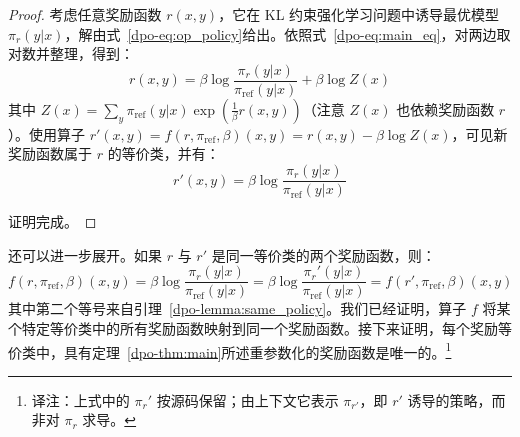\begin{proof}
考虑任意奖励函数 $r(x,y)$，它在 KL 约束强化学习问题中诱导最优模型 $\pi_r(y|x)$，解由式~\ref{dpo-eq:op_policy}给出。依照式~\ref{dpo-eq:main_eq}，对两边取对数并整理，得到：
\label{dpo-display-29}
\begin{equation*}
    r(x,y) =\beta \log \frac{\pi_r(y|x)}{\pi_{\mathrm{ref}}(y|x)} + \beta \log Z(x)
\end{equation*}
其中 $Z(x)=\sum_y\pi_{\mathrm{ref}}(y|x)\exp(\frac1\beta r(x,y))$（注意 $Z(x)$ 也依赖奖励函数 $r$）。使用算子 $r'(x,y)=f(r,\pi_{\mathrm{ref}},\beta)(x,y)=r(x,y)-\beta\log Z(x)$，可见新奖励函数属于 $r$ 的等价类，并有：
\label{dpo-display-30}
\begin{equation*}
    r'(x,y) =\beta \log \frac{\pi_r(y|x)}{\pi_{\mathrm{ref}}(y|x)}
\end{equation*}

证明完成。\qedhere
\end{proof}


还可以进一步展开。如果 $r$ 与 $r'$ 是同一等价类的两个奖励函数，则：
\label{dpo-display-31}
\begin{equation*}
    f(r, \pi_{\mathrm{ref}}, \beta)(x, y)= \beta \log \frac{\pi_r(y|x)}{\pi_{\mathrm{ref}}(y|x)}=
\beta \log \frac{\pi_r'(y|x)}{\pi_{\mathrm{ref}}(y|x)} = f(r', \pi_{\mathrm{ref}}, \beta)(x, y)
\end{equation*}
其中第二个等号来自引理~\ref{dpo-lemma:same_policy}。我们已经证明，算子 $f$ 将某个特定等价类中的所有奖励函数映射到同一个奖励函数。接下来证明，每个奖励等价类中，具有定理~\ref{dpo-thm:main}所述重参数化的奖励函数是唯一的。\footnote{译注：上式中的 $\pi_r'$ 按源码保留；由上下文它表示 $\pi_{r'}$，即 $r'$ 诱导的策略，而非对 $\pi_r$ 求导。}

